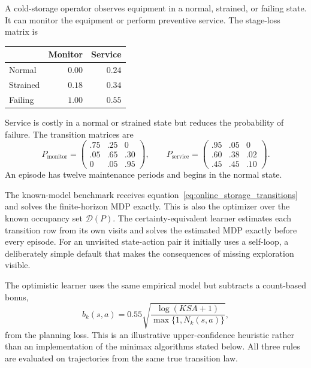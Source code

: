 A cold-storage operator observes equipment in a normal, strained, or failing state. It can monitor the equipment or perform preventive service. The stage-loss matrix is
\begin{center}
\begin{tabular}{lrr}
\toprule
 & Monitor & Service \\
\midrule
Normal & $0.00$ & $0.24$ \\
Strained & $0.18$ & $0.34$ \\
Failing & $1.00$ & $0.55$ \\
\bottomrule
\end{tabular}
\end{center}
Service is costly in a normal or strained state but reduces the probability of failure. The transition matrices are
\begin{equation}
P_{\mathrm{monitor}}
=
\begin{pmatrix}
.75&.25&0\\
.05&.65&.30\\
0&.05&.95
\end{pmatrix},
\qquad
P_{\mathrm{service}}
=
\begin{pmatrix}
.95&.05&0\\
.60&.38&.02\\
.45&.45&.10
\end{pmatrix}.
\label{eq:online_storage_transitions}
\end{equation}
An episode has twelve maintenance periods and begins in the normal state.

The known-model benchmark receives equation~\eqref{eq:online_storage_transitions} and solves the finite-horizon MDP exactly. This is also the optimizer over the known occupancy set $\mathcal D(P)$. The certainty-equivalent learner estimates each transition row from its own visits and solves the estimated MDP exactly before every episode. For an unvisited state-action pair it initially uses a self-loop, a deliberately simple default that makes the consequences of missing exploration visible.

The optimistic learner uses the same empirical model but subtracts a count-based bonus,
\begin{equation}
b_k(s,a)
=
0.55
\sqrt{
\frac{\log(KSA+1)}
{\max\{1,N_k(s,a)\}}
},
\label{eq:online_storage_bonus}
\end{equation}
from the planning loss. This is an illustrative upper-confidence heuristic rather than an implementation of the minimax algorithms stated below. All three rules are evaluated on trajectories from the same true transition law.

